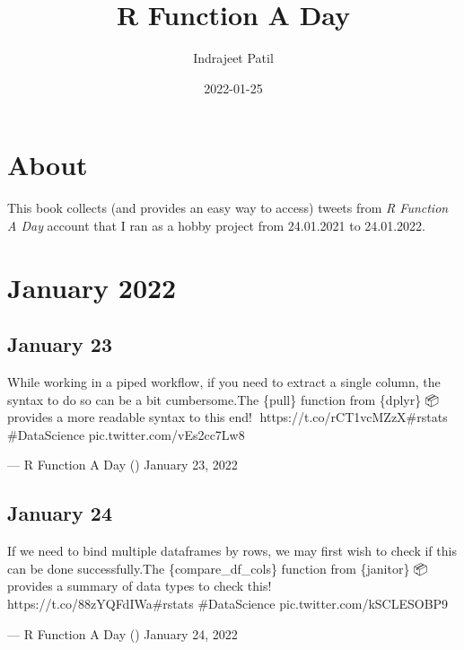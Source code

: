\documentclass[
]{book}
\title{R Function A Day}
\author{Indrajeet Patil}
\date{2022-01-25}
\begin{document}
\maketitle

{
\setcounter{tocdepth}{1}
\tableofcontents
}
\hypertarget{about}{%
\chapter*{About}\label{about}}

This book collects (and provides an easy way to access) tweets from \emph{R Function A Day} account that I ran as a hobby project from 24.01.2021 to 24.01.2022.

\hypertarget{january-2022}{%
\chapter*{January 2022}\label{january-2022}}

\hypertarget{january-23}{%
\section*{January 23}\label{january-23}}

While working in a piped workflow, if you need to extract a single column, the syntax to do so can be a bit cumbersome.The \{pull\} function from \{dplyr\} 📦 provides a more readable syntax to this end! 💄https://t.co/rCT1vcMZzX\#rstats \#DataScience pic.twitter.com/vEs2cc7Lw8

--- R Function A Day (\citet{rfunctionaday}) January 23, 2022

\hypertarget{january-24}{%
\section*{January 24}\label{january-24}}

If we need to bind multiple dataframes by rows, we may first wish to check if this can be done successfully.The \{compare\_df\_cols\} function from \{janitor\} 📦 provides a summary of data types to check this! 🍎🍏https://t.co/88zYQFdIWa\#rstats \#DataScience pic.twitter.com/kSCLESOBP9

--- R Function A Day (\citet{rfunctionaday}) January 24, 2022

  
\end{document}
